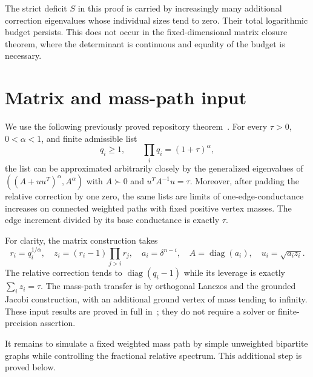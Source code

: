 \documentclass[11pt]{article}
\newcommand{\diag}{\operatorname{diag}}
\begin{document}
The strict deficit $S$ in this proof is carried by increasingly many
additional correction eigenvalues whose individual sizes tend to zero.
Their total logarithmic budget persists. This does not occur in the
fixed-dimensional matrix closure theorem, where the determinant is
continuous and equality of the budget is necessary.

\section{Matrix and mass-path input}
We use the following previously proved repository theorem~\cite{Relative}.
For every $\tau>0$, $0<\alpha<1$, and finite admissible list
\[
 q_i\ge1,\qquad \prod_iq_i=(1+\tau)^\alpha,
\]
the list can be approximated arbitrarily closely by the generalized
eigenvalues of $((A+uu^T)^\alpha,A^\alpha)$ with $A\succ0$ and
$u^TA^{-1}u=\tau$. Moreover, after padding the relative correction
by one zero, the same lists are limits of one-edge-conductance increases
on connected weighted paths with fixed positive vertex masses.
The edge increment divided by its base conductance is exactly $\tau$.

For clarity, the matrix construction takes
\[
 r_i=q_i^{1/\alpha},\quad
 z_i=(r_i-1)\prod_{j>i}r_j,\quad
 a_i=\delta^{n-i},\quad A=\diag(a_i),\quad u_i=\sqrt{a_i z_i}.
\]
The relative correction tends to $\diag(q_i-1)$ while its leverage is
exactly $\sum_i z_i=\tau$. The mass-path transfer is by orthogonal
Lanczos and the grounded Jacobi construction, with an additional
ground vertex of mass tending to infinity. These input results are
proved in full in~\cite{Relative}; they do not require a solver or
finite-precision assertion.

It remains to simulate a fixed weighted mass path by simple unweighted
bipartite graphs while controlling the fractional relative spectrum.
This additional step is proved below.
\end{document}
